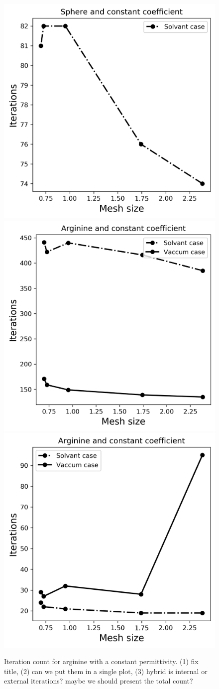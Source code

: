\begin{figure}
\centering
\includegraphics[width=0.45\linewidth]{BEM_BEM_Arginine_const_coeff_iter.png}
\includegraphics[width=0.45\linewidth]{FEM_BEM_Arginine_const_coeff_iter.png}
\includegraphics[width=0.45\linewidth]{Hybrid_FEM_BEM_Arginine_const_coeff_iter.png}
\caption{Iteration count for arginine with a constant permittivity. (1) fix title, (2) can we put them in a single plot, (3) hybrid is internal or external iterations? maybe we should present the total count?}
\label{fig:arg_contant_iter}
\end{figure}


